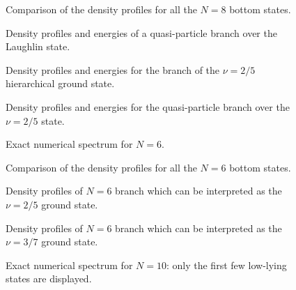 \begin{figure}
\epsfxsize=14cm \centerline{}
\caption{Comparison of the density profiles for all
the $N=8$ bottom states.}
\label{fig30}
\end{figure}

\begin{figure}
\epsfxsize=14cm \centerline{}
\caption{Density profiles and energies of a quasi-particle branch
over the Laughlin state.}
\label{fig4}
\end{figure}

\begin{figure}
\epsfxsize=14cm \centerline{}
\caption{Density profiles and energies for the branch of the 
$\nu=2/5$ hierarchical ground state.}
\label{fig5}
\end{figure}

\begin{figure}
\epsfxsize=14cm \centerline{}
\caption{Density profiles and energies for the quasi-particle branch 
over the $\nu=2/5$ state.}
\label{fig6}
\end{figure}

\begin{figure}
\epsfxsize=14cm \centerline{}
\caption{Exact numerical spectrum for $N=6$.}
\label{fig7}
\end{figure}

\begin{figure}
\epsfxsize=14cm \centerline{}
\caption{Comparison of the density profiles for all
the $N=6$ bottom states.}
\label{fig70}
\end{figure}

\begin{figure}
\epsfxsize=14cm \centerline{}
\caption{Density profiles of $N=6$ branch which can be interpreted 
as the $\nu=2/5$ ground state.}
\label{fig71}
\end{figure}

\begin{figure}
\epsfxsize=14cm \centerline{}
\caption{Density profiles of $N=6$ branch which can be interpreted 
as the $\nu=3/7$ ground state.}
\label{fig8}
\end{figure}

\begin{figure}
\epsfxsize=14cm \centerline{}
\caption{Exact numerical spectrum for $N=10$:
only the  first few low-lying states are displayed.}
\label{fig10}
\end{figure}

